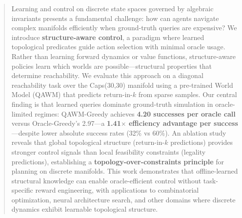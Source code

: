 
\begin{abstract}
Learning and control on discrete state spaces governed by algebraic invariants presents a fundamental challenge: how can agents navigate complex manifolds efficiently when ground-truth queries are expensive? We introduce \textbf{structure-aware control}, a paradigm where learned topological predicates guide action selection with minimal oracle usage. Rather than learning forward dynamics or value functions, structure-aware policies learn which worlds are possible—structural properties that determine reachability. We evaluate this approach on a diagonal reachability task over the Caps(30,30) manifold using a pre-trained World Model (QAWM) that predicts return-in-$k$ from sparse samples. Our central finding is that learned queries dominate ground-truth simulation in oracle-limited regimes: QAWM-Greedy achieves \textbf{4.20 successes per oracle call} versus Oracle-Greedy's 2.97—a \textbf{1.41$\times$ efficiency advantage per success}—despite lower absolute success rates (32\% vs 60\%). An ablation study reveals that global topological structure (return-in-$k$ predictions) provides stronger control signals than local feasibility constraints (legality predictions), establishing a \textbf{topology-over-constraints principle} for planning on discrete manifolds. This work demonstrates that offline-learned structural knowledge can enable oracle-efficient control without task-specific reward engineering, with applications to combinatorial optimization, neural architecture search, and other domains where discrete dynamics exhibit learnable topological structure.
\end{abstract}
